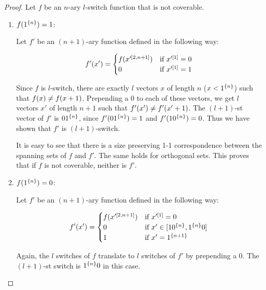\begin{proof}
Let $f$ be an $n$-ary $l$-switch function
that is not coverable.

\begin{enumerate}
\item $f (1^{\{n\}}) = 1$:

Let $f'$ be an $(n+1)$-ary function
defined in the following way:

\[
f' (x') =
\begin{cases}
f (x'^{[2, n+1]}) & \text{if } x'^{[1]} = 0 \\
0 & \text{if } x'^{[1]} = 1
\end{cases}
\]

Since $f$ is $l$-switch,
there are exactly $l$ vectors $x$ of length $n$
($x < 1^{\{n\}}$)
such that $f (x) \neq f (x+1)$.
Prepending a $0$ to each of these vectors,
we get $l$ vectors $x'$ of length $n+1$
such that $f' (x') \neq f' (x'+1)$.
The $(l+1)$-st  vector of $f'$
is $0 1^{\{n\}}$,
since $f' (0 1^{\{n\}}) = 1$
and $f' (1 0^{\{n\}}) = 0$.
Thus we have shown that $f'$ is $(l+1)$-switch.

It is easy to see that there is
a size preserving 1-1 correspondence
between the spanning sets of $f$ and $f'$.
The same holds for orthogonal sets.
This proves that if $f$ is not coverable,
neither is $f'$.

\item $f (1^{\{n\}}) = 0$:

Let $f'$ be an $(n+1)$-ary function
defined in the following way:

\[
f' (x') =
\begin{cases}
f (x'^{[2, n+1]}) & \text{if } x'^{[1]} = 0 \\
0 & \text{if } x' \in [1 0^{\{n\}}, 1^{\{n\}} 0] \\
1 & \text{if } x' = 1^{\{n+1\}}
\end{cases}
\]


Again,
the $l$ switches of $f$ translate to $l$ switches of $f'$
by prepending a $0$.
The $(l+1)$-st switch is $1^{\{n\}} 0$ in this case.


\end{enumerate}
\end{proof}
